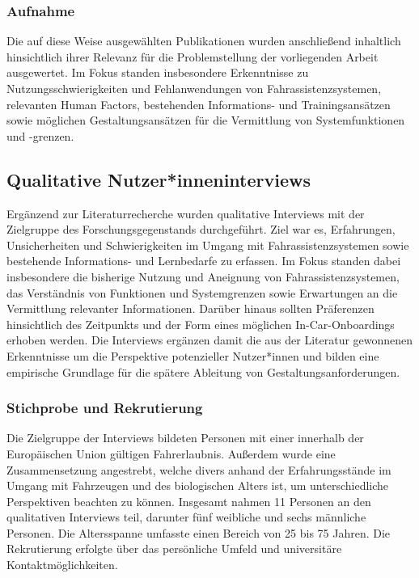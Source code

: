 \subsubsection{Aufnahme}
\label{subsubsec:Aufnahme}
Die auf diese Weise ausgewählten Publikationen wurden anschließend inhaltlich hinsichtlich ihrer Relevanz für die Problemstellung der vorliegenden Arbeit ausgewertet. Im Fokus standen insbesondere Erkenntnisse zu Nutzungsschwierigkeiten und Fehlanwendungen von Fahrassistenzsystemen,
relevanten Human Factors, bestehenden Informations- und Trainingsansätzen sowie möglichen Gestaltungsansätzen für die Vermittlung von Systemfunktionen und -grenzen. 

\subsection{Qualitative Nutzer*inneninterviews}
\label{subsec:Qualitative_Interviews}

Ergänzend zur Literaturrecherche wurden qualitative Interviews mit der Zielgruppe des Forschungsgegenstands durchgeführt. Ziel war es, Erfahrungen, Unsicherheiten und Schwierigkeiten im Umgang mit Fahrassistenzsystemen sowie bestehende Informations- und Lernbedarfe zu erfassen. Im Fokus standen dabei insbesondere die bisherige Nutzung und Aneignung von Fahrassistenzsystemen, das Verständnis von Funktionen und Systemgrenzen sowie Erwartungen an die Vermittlung relevanter Informationen. Darüber hinaus sollten Präferenzen hinsichtlich des Zeitpunkts und der Form eines möglichen In-Car-Onboardings erhoben werden. Die Interviews ergänzen damit die aus der Literatur gewonnenen Erkenntnisse um die Perspektive potenzieller Nutzer*innen und bilden eine empirische Grundlage für die spätere Ableitung von Gestaltungsanforderungen.

\subsubsection{Stichprobe und Rekrutierung}
\label{subsubsec:Stichprobe_und_Rekrutierung}

Die Zielgruppe der Interviews bildeten Personen mit einer innerhalb der Europäischen Union gültigen Fahrerlaubnis. Außerdem wurde eine Zusammensetzung angestrebt, welche divers anhand der Erfahrungsstände im Umgang mit Fahrzeugen und des biologischen Alters ist, um unterschiedliche Perspektiven beachten zu können. Insgesamt nahmen 11 Personen an den qualitativen Interviews teil, darunter fünf weibliche und sechs männliche Personen. Die Altersspanne umfasste einen Bereich von 25 bis 75 Jahren. Die Rekrutierung erfolgte über das persönliche Umfeld und universitäre Kontaktmöglichkeiten.

